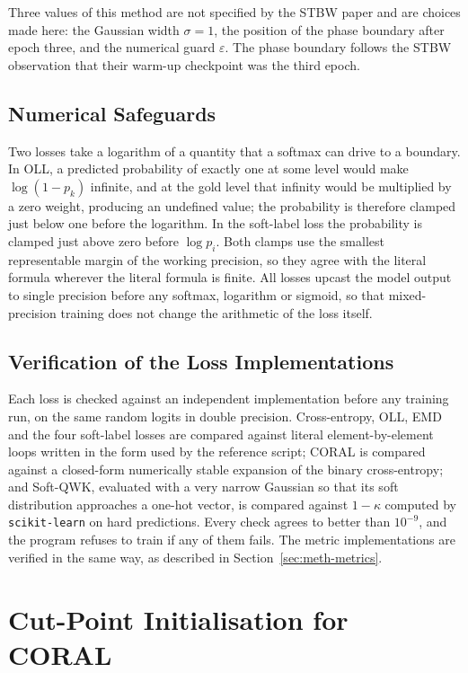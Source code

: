 Three values of this method are not specified by the STBW paper and are choices made here: the
Gaussian width $\sigma=1$, the position of the phase boundary after epoch three, and the
numerical guard $\varepsilon$. The phase boundary follows the STBW observation that their
warm-up checkpoint was the third epoch.

\subsection{Numerical Safeguards}

Two losses take a logarithm of a quantity that a softmax can drive to a boundary. In OLL, a
predicted probability of exactly one at some level would make $\log(1-p_k)$ infinite, and at
the gold level that infinity would be multiplied by a zero weight, producing an undefined
value; the probability is therefore clamped just below one before the logarithm. In the
soft-label loss the probability is clamped just above zero before $\log p_i$. Both clamps use
the smallest representable margin of the working precision, so they agree with the literal
formula wherever the literal formula is finite. All losses upcast the model output to
single precision before any softmax, logarithm or sigmoid, so that mixed-precision training
does not change the arithmetic of the loss itself.

\subsection{Verification of the Loss Implementations}

Each loss is checked against an independent implementation before any training run, on the same
random logits in double precision. Cross-entropy, OLL, EMD and the four soft-label losses are
compared against literal element-by-element loops written in the form used by the reference
script; CORAL is compared against a closed-form numerically stable expansion of the binary
cross-entropy; and Soft-QWK, evaluated with a very narrow Gaussian so that its soft
distribution approaches a one-hot vector, is compared against $1-\kappa$ computed by
\texttt{scikit-learn} on hard predictions. Every check agrees to better than $10^{-9}$, and the
program refuses to train if any of them fails. The metric implementations are verified in the
same way, as described in Section~\ref{sec:meth-metrics}.

\section{Cut-Point Initialisation for CORAL}
\label{sec:meth-coral-init}

